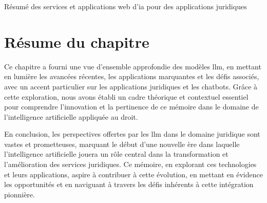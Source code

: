 \begin{table}[h]
    \caption{Résumé des services et applications web d'\acf{ia} pour des applications juridiques}
    \label{table:law-ai-tool}
\end{table}



\section{Résume du chapitre}

Ce chapitre a fourni une vue d'ensemble approfondie des modèles \ac{llm}, en mettant en lumière les avancées récentes, les applications marquantes et les défis associés, avec un accent particulier sur les applications juridiques et les chatbots. Grâce à cette exploration, nous avons établi un cadre théorique et contextuel essentiel pour comprendre l'innovation et la pertinence de ce mémoire dans le domaine de l'intelligence artificielle appliquée au droit. 

En conclusion, les perspectives offertes par les \ac{llm} dans le domaine juridique sont vastes et prometteuses, marquant le début d'une nouvelle ère dans laquelle l'intelligence artificielle jouera un rôle central dans la transformation et l'amélioration des services juridiques. Ce mémoire, en explorant ces technologies et leurs applications, aspire à contribuer à cette évolution, en mettant en évidence les opportunités et en naviguant à travers les défis inhérents à cette intégration pionnière.